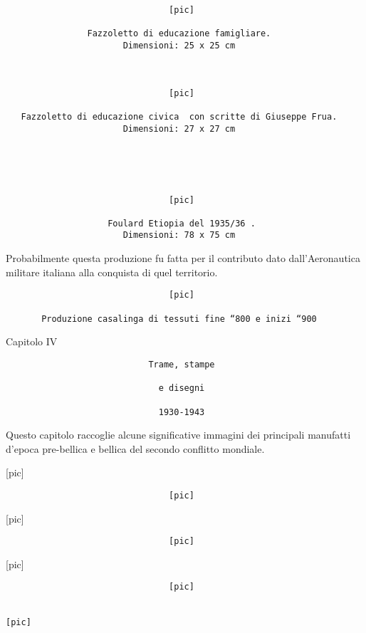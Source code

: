\begin{verbatim}
                                [pic]

                Fazzoletto di educazione famigliare.
                       Dimensioni: 25 x 25 cm



                                [pic]

   Fazzoletto di educazione civica  con scritte di Giuseppe Frua.
                       Dimensioni: 27 x 27 cm





                                [pic]

                    Foulard Etiopia del 1935/36 .
                       Dimensioni: 78 x 75 cm
\end{verbatim}

Probabilmente questa produzione fu fatta per il contributo dato
dall'Aeronautica militare italiana alla conquista di quel territorio.

\begin{verbatim}
                                [pic]

       Produzione casalinga di tessuti fine “800 e inizi “900
\end{verbatim}

Capitolo IV

\begin{verbatim}
                            Trame, stampe

                              e disegni

                              1930-1943
\end{verbatim}

Questo capitolo raccoglie alcune significative immagini dei principali
manufatti d'epoca pre-bellica e bellica del secondo conflitto mondiale.

{[}pic{]}

\begin{verbatim}
                                [pic]
\end{verbatim}

{[}pic{]}

\begin{verbatim}
                                [pic]
\end{verbatim}

{[}pic{]}

\begin{verbatim}
                                [pic]

                                                                   [pic]
\end{verbatim}

